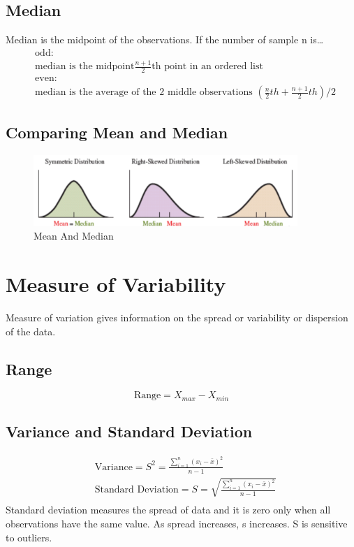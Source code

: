 \documentclass{article}
\begin{document}
    \subsection*{Median}
    Median is the midpoint of the observations.
    If the number of sample n is\dots
    \begin{align*}
        &\text{odd:}\\ 
        &\text{median is the midpoint} \frac{n+1}{2}\text{th point in an ordered list} \\
        &\text{even:}\\  
        &\text{median is the average of the 2 middle observations } (\frac{n}{2}th + \frac{n+1}{2}th) / 2
    \end{align*}

    \subsection*{Comparing Mean and Median}
    \begin{figure}[H]
        \centering
        \includegraphics[width=10cm]{figures/mean_and_median.PNG}
        \caption{Mean And Median}
        \label{fig:mean_and_median}
    \end{figure}

    \section*{Measure of Variability}
    Measure of variation gives information on the spread or variability or dispersion of the data.
    \subsection*{Range}
        \begin{equation*} 
            \text{Range} = X_{max} - X_{min}
        \end{equation*}
    
    \subsection*{Variance and Standard Deviation}
    \begin{align*}
        &\text{Variance} = S^{2} = \frac{ \sum_{i = 1}^{n} (x_{i}- \bar{x})^{2}} {n-1}\\
        &\text{Standard Deviation} = S = \sqrt{\frac{ \sum_{i = 1}^{n} (x_{i}- \bar{x})^{2}} {n-1}}\\
    \end{align*}
    Standard deviation measures the spread of data and it is zero only when all observations have the same value.
    As spread increases, s increases. S is sensitive to outliers.
\end{document}
